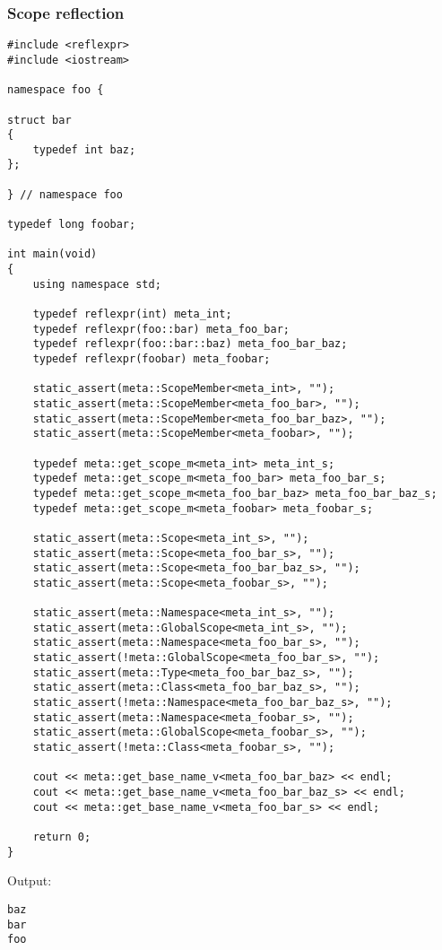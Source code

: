 \subsubsection{Scope reflection}

\begin{verbatim}
#include <reflexpr>
#include <iostream>

namespace foo {

struct bar
{
	typedef int baz;
};

} // namespace foo

typedef long foobar;

int main(void)
{
	using namespace std;

	typedef reflexpr(int) meta_int;
	typedef reflexpr(foo::bar) meta_foo_bar;
	typedef reflexpr(foo::bar::baz) meta_foo_bar_baz;
	typedef reflexpr(foobar) meta_foobar;

	static_assert(meta::ScopeMember<meta_int>, "");
	static_assert(meta::ScopeMember<meta_foo_bar>, "");
	static_assert(meta::ScopeMember<meta_foo_bar_baz>, "");
	static_assert(meta::ScopeMember<meta_foobar>, "");

	typedef meta::get_scope_m<meta_int> meta_int_s;
	typedef meta::get_scope_m<meta_foo_bar> meta_foo_bar_s;
	typedef meta::get_scope_m<meta_foo_bar_baz> meta_foo_bar_baz_s;
	typedef meta::get_scope_m<meta_foobar> meta_foobar_s;

	static_assert(meta::Scope<meta_int_s>, "");
	static_assert(meta::Scope<meta_foo_bar_s>, "");
	static_assert(meta::Scope<meta_foo_bar_baz_s>, "");
	static_assert(meta::Scope<meta_foobar_s>, "");

	static_assert(meta::Namespace<meta_int_s>, "");
	static_assert(meta::GlobalScope<meta_int_s>, "");
	static_assert(meta::Namespace<meta_foo_bar_s>, "");
	static_assert(!meta::GlobalScope<meta_foo_bar_s>, "");
	static_assert(meta::Type<meta_foo_bar_baz_s>, "");
	static_assert(meta::Class<meta_foo_bar_baz_s>, "");
	static_assert(!meta::Namespace<meta_foo_bar_baz_s>, "");
	static_assert(meta::Namespace<meta_foobar_s>, "");
	static_assert(meta::GlobalScope<meta_foobar_s>, "");
	static_assert(!meta::Class<meta_foobar_s>, "");

	cout << meta::get_base_name_v<meta_foo_bar_baz> << endl;
	cout << meta::get_base_name_v<meta_foo_bar_baz_s> << endl;
	cout << meta::get_base_name_v<meta_foo_bar_s> << endl;

	return 0;
}
\end{verbatim}

Output:

\begin{verbatim}
baz
bar
foo
\end{verbatim}

